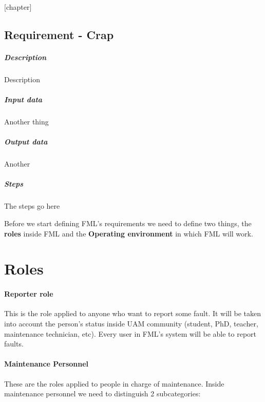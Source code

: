 
[chapter]
\newcommand{\header}[1]{\\ \indent \textbf{#1}\hspace{10pt}}

\newcommand{\reqdesc}{\subparagraph{Description}}
\newcommand{\reqin}{\subparagraph{Input data}}
\newcommand{\reqout}{\subparagraph{Output data}}
\newcommand{\reqsteps}{\subparagraph{Steps}}

\newenvironment{requirement}[1]{
	\subsection{Requirement  - #1}
}{\vspace{20pt}}

\begin{requirement}{Crap}
\reqdesc Description

\reqin Another thing

\reqout Another

\reqsteps The steps go here

\end{requirement}

Before we start defining FML's requirements we need to define two things, the \textbf{roles} inside FML and the \textbf{Operating environment} in which FML will work.


\label{chapRequirements}
\section{Roles}

\paragraph{Reporter role} \label{ReporterRole} This is the role applied to anyone who want to report some fault. It will be taken into account the person's status inside UAM community (student, PhD, teacher, maintenance technician, etc). Every user in FML's system will be able to report faults.

\paragraph{Maintenance Personnel} \label{MaintenancePersonnel}

These are the roles applied to people in charge of maintenance. Inside maintenance personnel we need to distinguish 2 subcategories:

